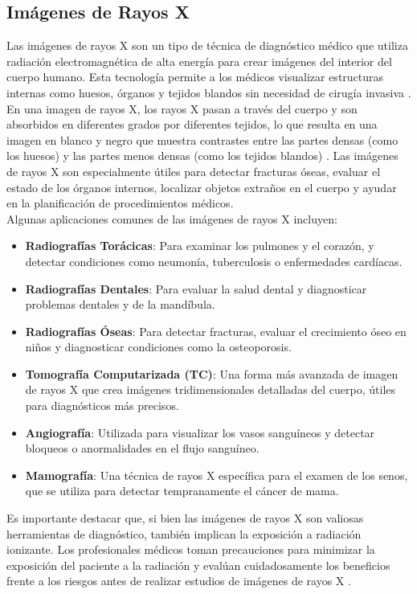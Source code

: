 \documentclass[12pt,twoside,titlepage]{ingenius}
\begin{document}
\begin{multicols}{2}
\subsection{Imágenes de Rayos X}
Las imágenes de rayos X son un tipo de técnica de diagnóstico médico que utiliza radiación electromagnética de alta energía para crear imágenes del interior del cuerpo humano. Esta tecnología permite a los médicos visualizar estructuras internas como huesos, órganos y tejidos blandos sin necesidad de cirugía invasiva \cite{14}.\\

En una imagen de rayos X, los rayos X pasan a través del cuerpo y son absorbidos en diferentes grados por diferentes tejidos, lo que resulta en una imagen en blanco y negro que muestra contrastes entre las partes densas (como los huesos) y las partes menos densas (como los tejidos blandos) \cite{15}. Las imágenes de rayos X son especialmente útiles para detectar fracturas óseas, evaluar el estado de los órganos internos, localizar objetos extraños en el cuerpo y ayudar en la planificación de procedimientos médicos.\\

Algunas aplicaciones comunes de las imágenes de rayos X incluyen:
\begin{itemize}
	\item \textbf{Radiografías Torácicas}: Para examinar los pulmones y el corazón, y detectar condiciones como neumonía, tuberculosis o enfermedades cardíacas.
	\item \textbf{Radiografías Dentales}: Para evaluar la salud dental y diagnosticar problemas dentales y de la mandíbula.
	\item \textbf{Radiografías Óseas}: Para detectar fracturas, evaluar el crecimiento óseo en niños y diagnosticar condiciones como la osteoporosis.
	\item \textbf{Tomografía Computarizada (TC)}: Una forma más avanzada de imagen de rayos X que crea imágenes tridimensionales detalladas del cuerpo, útiles para diagnósticos más precisos.
	\item \textbf{Angiografía}: Utilizada para visualizar los vasos sanguíneos y detectar bloqueos o anormalidades en el flujo sanguíneo.
	\item \textbf{Mamografía}: Una técnica de rayos X específica para el examen de los senos, que se utiliza para detectar tempranamente el cáncer de mama.
\end{itemize}

Es importante destacar que, si bien las imágenes de rayos X son valiosas herramientas de diagnóstico, también implican la exposición a radiación ionizante. Los profesionales médicos toman precauciones para minimizar la exposición del paciente a la radiación y evalúan cuidadosamente los beneficios frente a los riesgos antes de realizar estudios de imágenes de rayos X \cite{16}.


\end{multicols}
\end{document}
